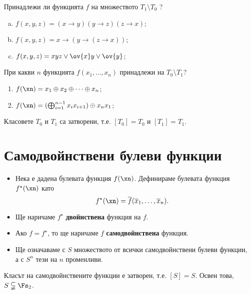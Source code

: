 \begin{problem}%
  Принадлежи ли функцията $f$ на множеството $T_1 \setminus T_0$ ?
  \begin{enumerate}[a)]
  \item
    $f(x,y,z) = (x\rightarrow y)(y\rightarrow z)(z\rightarrow x)$;
  \item
    $f(x,y,z) = x\rightarrow(y\rightarrow (z\rightarrow x))$;
  \item
    $f(x,y,z) = xyz \vee \ov{x}y \vee \ov{y}$;
  \end{enumerate}
\end{problem}

\begin{problem}
  При какви $n$ функцията $f(x_1,\dots, x_n)$ принадлежи на $T_0\setminus T_1$?
  \begin{enumerate}[1)]
  \item
    $f(\xn) = x_1\oplus x_2 \oplus\dots\oplus x_n$;
  \item
    $f(\xn) = (\bigoplus^{n-1}_{i=1} x_ix_{i+1})\oplus x_nx_1$;
  \end{enumerate}
\end{problem}

\begin{prop}
  Класовете $T_0$ и $T_1$ са затворени, т.е. $[T_0] = T_0$ и $[T_1] = T_1$.
\end{prop}


\section{Самодвойнствени булеви функции}
\begin{itemize}
\item 
  Нека е дадена булевата функция $f(\xn)$. Дефинираме булевата функция $f^\star(\xn)$ като
  \[f^\star(\xn) = \overline{f}(\overline{x}_1,\dots,\overline{x}_n).\]
\item
  Ще наричаме $f^\star$ {\bf двойнствена} функция на $f$.
\item
  Ако $f = f^\star$, то ще наричаме $f$ {\bf самодвойнствена} функция.
\item
  Ще означаваме с $S$ множеството от всички самодвойнствени булеви функции, а с $S^n$ тези на $n$ променливи.
\end{itemize}

\begin{prop}
  Класът на самодвойнствените функции е затворен, т.е. $[S] = S$.
  Освен това, $S \subsetneqq \Fs_2$.
\end{prop}


